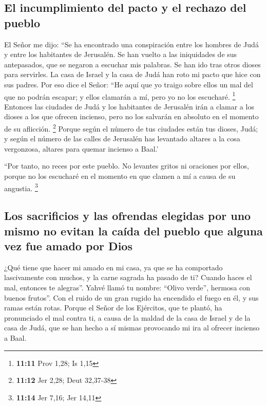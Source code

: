 \hypertarget{el-incumplimiento-del-pacto-y-el-rechazo-del-pueblo}{%
\subsection{El incumplimiento del pacto y el rechazo del
pueblo}\label{el-incumplimiento-del-pacto-y-el-rechazo-del-pueblo}}

 El Señor me dijo: ``Se ha encontrado una conspiración
entre los hombres de Judá y entre los habitantes de Jerusalén.
 Se han vuelto a las iniquidades de sus antepasados, que
se negaron a escuchar mis palabras. Se han ido tras otros dioses para
servirles. La casa de Israel y la casa de Judá han roto mi pacto que
hice con sus padres.  Por eso dice el Señor: ``He aquí
que yo traigo sobre ellos un mal del que no podrán escapar; y ellos
clamarán a mí, pero yo no los escucharé. \footnote{\textbf{11:11} Prov
  1,28; Is 1,15}  Entonces las ciudades de Judá y los
habitantes de Jerusalén irán a clamar a los dioses a los que ofrecen
incienso, pero no los salvarán en absoluto en el momento de su
aflicción. \footnote{\textbf{11:12} Jer 2,28; Deut 32,37-38}
 Porque según el número de tus ciudades están tus dioses,
Judá; y según el número de las calles de Jerusalén has levantado altares
a la cosa vergonzosa, altares para quemar incienso a Baal.'

 ``Por tanto, no reces por este pueblo. No levantes
gritos ni oraciones por ellos, porque no los escucharé en el momento en
que clamen a mí a causa de su angustia. \footnote{\textbf{11:14} Jer
  7,16; Jer 14,11}

\hypertarget{los-sacrificios-y-las-ofrendas-elegidas-por-uno-mismo-no-evitan-la-cauxedda-del-pueblo-que-alguna-vez-fue-amado-por-dios}{%
\subsection{Los sacrificios y las ofrendas elegidas por uno mismo no
evitan la caída del pueblo que alguna vez fue amado por
Dios}\label{los-sacrificios-y-las-ofrendas-elegidas-por-uno-mismo-no-evitan-la-cauxedda-del-pueblo-que-alguna-vez-fue-amado-por-dios}}

 ¿Qué tiene que hacer mi amado en mi casa, ya que se ha
comportado lascivamente con muchos, y la carne sagrada ha pasado de ti?
Cuando haces el mal, entonces te alegras''.  Yahvé llamó
tu nombre: ``Olivo verde'', hermosa con buenos frutos''. Con el ruido de
un gran rugido ha encendido el fuego en él, y sus ramas están rotas.
 Porque el Señor de los Ejércitos, que te plantó, ha
pronunciado el mal contra ti, a causa de la maldad de la casa de Israel
y de la casa de Judá, que se han hecho a sí mismas provocando mi ira al
ofrecer incienso a Baal.

